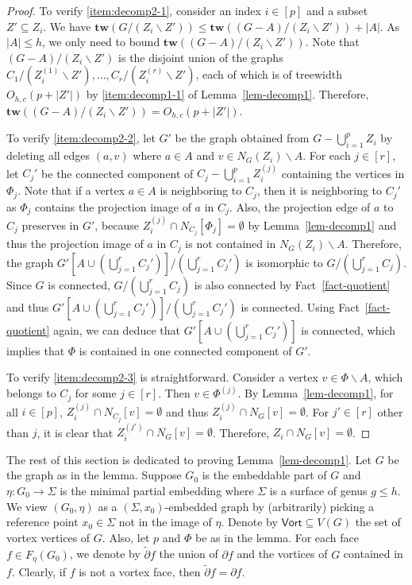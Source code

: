 \documentclass[a4paper,11pt]{article}
\numberwithin{lemma}{section}
\newcommand{\tw}{\mathbf{tw}}
\begin{document}
\begin{proof}
To verify \ref{item:decomp2-1}, consider an index $i \in [p]$ and a subset $Z' \subseteq Z_i$.
We have $\tw(G/(Z_i \backslash Z')) \leq \tw((G-A)/(Z_i \backslash Z')) + |A|$.
As $|A| \leq h$, we only need to bound $\tw((G-A)/(Z_i \backslash Z'))$.
Note that $(G-A)/(Z_i \backslash Z')$ is the disjoint union of the graphs $C_1/(Z_i^{(1)} \backslash Z'),\dots,C_r/(Z_i^{(r)} \backslash Z')$, each of which is of treewidth $O_{h,c}(p+|Z'|)$ by \ref{item:decomp1-1} of Lemma~\ref{lem-decomp1}.
Therefore, $\tw((G-A)/(Z_i \backslash Z')) = O_{h,c}(p+|Z'|)$.

To verify \ref{item:decomp2-2}, let $G'$ be the graph obtained from $G - \bigcup_{i=1}^p Z_i$ by deleting all edges $(a,v)$ where $a \in A$ and $v \in N_G(Z_i) \backslash A$.
For each $j \in [r]$, let $C_j'$ be the connected component of $C_j - \bigcup_{i=1}^p Z_i^{(j)}$ containing the vertices in $\varPhi_j$.
Note that if a vertex $a \in A$ is neighboring to $C_j$, then it is neighboring to $C_j'$ as $\varPhi_j$ contains the projection image of $a$ in $C_j$.
Also, the projection edge of $a$ to $C_j$ preserves in $G'$, because $Z_i^{(j)} \cap N_{C_j}[\varPhi_j] = \emptyset$ by Lemma~\ref{lem-decomp1} and thus the projection image of $a$ in $C_j$ is not contained in $N_G(Z_i) \backslash A$.
Therefore, the graph $G'[A \cup (\bigcup_{j=1}^r C_j')]/(\bigcup_{j=1}^r C_j')$ is isomorphic to $G/(\bigcup_{j=1}^r C_j)$.
Since $G$ is connected, $G/(\bigcup_{j=1}^r C_j)$ is also connected by Fact~\ref{fact-quotient} and thus $G'[A \cup (\bigcup_{j=1}^r C_j')]/(\bigcup_{j=1}^r C_j')$ is connected.
Using Fact~\ref{fact-quotient} again, we can deduce that $G'[A \cup (\bigcup_{j=1}^r C_j')]$ is connected, which implies that $\varPhi$ is contained in one connected component of $G'$.

To verify \ref{item:decomp2-3} is straightforward.
Consider a vertex $v \in \varPhi \backslash A$, which belongs to $C_j$ for some $j \in [r]$.
Then $v \in \varPhi^{(j)}$.
By Lemma~\ref{lem-decomp1}, for all $i \in [p]$, $Z_i^{(j)} \cap N_{C_j}[v] = \emptyset$ and thus $Z_i^{(j)} \cap N_G[v] = \emptyset$.
For $j' \in [r]$ other than $j$, it is clear that $Z_i^{(j')} \cap N_G[v] = \emptyset$.
Therefore, $Z_i \cap N_G[v] = \emptyset$.
\end{proof}

The rest of this section is dedicated to proving Lemma~\ref{lem-decomp1}.
Let $G$ be the graph as in the lemma.
Suppose $G_0$ is the embeddable part of $G$ and $\eta\colon G_0 \rightarrow \varSigma$ is the minimal partial embedding where $\varSigma$ is a surface of genus $g \leq h$.
We view $(G_0,\eta)$ as a $(\varSigma,x_0)$-embedded graph by (arbitrarily) picking a reference point $x_0 \in \varSigma$ not in the image of $\eta$.
Denote by $\mathsf{Vort} \subseteq V(G)$ the set of vortex vertices of $G$.
Also, let $p$ and $\varPhi$ be as in the lemma.
For each face $f \in F_\eta(G_0)$, we denote by $\tilde{\partial} f$ the union of $\partial f$ and the vortices of $G$ contained in $f$.
Clearly, if $f$ is not a vortex face, then $\tilde{\partial} f = \partial f$.
\end{document}
